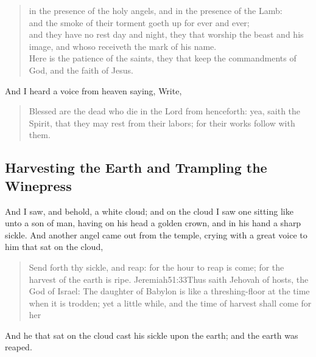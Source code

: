 \begin{verse}
in the presence of the holy angels, and in the presence of the Lamb:\\ 
and the smoke of their torment goeth up for ever and ever;%
	\\
and they have no rest day and night,%
they that worship the beast and his image, and whoso receiveth the mark of his name.\\
Here is the patience of the saints, they that keep the commandments of God, and the faith of Jesus.
\end{verse}
And I heard a voice from heaven saying, Write, 
\begin{quote}
Blessed are the dead who die in the Lord from henceforth: yea, saith the Spirit, that they may rest from their labors; for their works follow with them.
\end{quote}
\subsection*{Harvesting the Earth and Trampling the Winepress}
And I saw, and behold, a white cloud; and on the cloud I saw one sitting like unto a son of man,%
 having on his head a golden crown, and in his hand a sharp sickle. 
And another angel came out from the temple, crying with a great voice to him that sat on the cloud, 
\begin{quote}
Send forth thy sickle, and reap: for the hour to reap is come; for the harvest of the earth is ripe.%
				  {Jeremiah}{51:33}{Thus saith Jehovah of hosts, the God of Israel: The daughter of Babylon is like a threshing-floor at the time when it is trodden; yet a little while, and the time of harvest shall come for her}
\end{quote}
And he that sat on the cloud cast his sickle upon the earth; and the earth was reaped.

